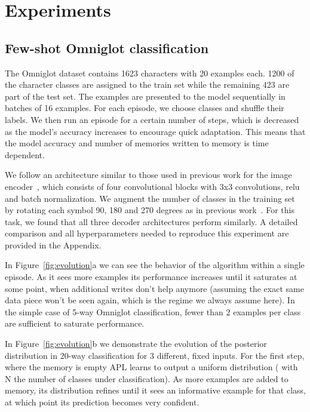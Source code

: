 \documentclass{article} \usepackage{iclr2019_conference,times}
\begin{document}
\section{Experiments}

\subsection{Few-shot Omniglot classification}

The Omniglot dataset contains 1623 characters with 20 examples each. 1200 of the character classes are assigned to the train set while the remaining 423 are part of the test set. The examples are presented to the model sequentially in batches of 16 examples. For each episode, we choose  classes and shuffle their labels. We then run an episode for a certain number of steps, which is decreased as the model's accuracy increases to encourage quick adaptation. This means that the model accuracy and number of memories written to memory is time dependent.

We follow an architecture similar to those used in previous work for the image encoder~\citep{vinyals2016matching, mishra2018a}, which consists of four convolutional blocks with 3x3 convolutions, relu and batch normalization. We augment the number of classes in the training set by rotating each symbol 90, 180 and 270 degrees as in previous work~\citep{santoro2016meta}. For this task, we found that all three decoder architectures perform similarly. A detailed comparison and all hyperparameters needed to reproduce this experiment are provided in the Appendix.

In Figure~\ref{fig:evolution}a we can see the behavior of the algorithm within a single episode. As it sees more examples its performance increases until it saturates at some point, when additional writes don't help anymore (assuming the exact same data piece won't be seen again, which is the regime we always assume here). In the simple case of 5-way Omniglot classification, fewer than 2 examples per class are sufficient to saturate performance.

In Figure~\ref{fig:evolution}b we demonstrate the evolution of the posterior distribution in 20-way classification for 3 different, fixed inputs. For the first step, where the memory is empty APL learns to output a uniform distribution ( with N the number of classes under classification). As more examples are added to memory, its distribution refines until it sees an informative example for that class, at which point its prediction becomes very confident. 
\end{document}
